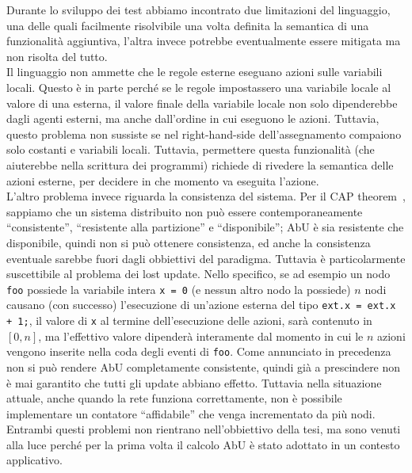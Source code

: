 \documentclass[target=bach]{thud}
\begin{document}
Durante lo sviluppo dei test abbiamo incontrato due limitazioni del linguaggio, una delle quali facilmente risolvibile una volta definita la semantica di una funzionalità aggiuntiva, l'altra invece potrebbe eventualmente essere mitigata ma non risolta del tutto.\\
Il linguaggio non ammette che le regole esterne eseguano azioni sulle variabili locali. Questo è in parte perché se le regole impostassero una variabile locale al valore di una esterna, il valore finale della variabile locale non solo dipenderebbe dagli agenti esterni, ma anche dall'ordine in cui eseguono le azioni. Tuttavia, questo problema non sussiste se nel right-hand-side dell'assegnamento compaiono solo costanti e variabili locali. Tuttavia, permettere questa funzionalità (che aiuterebbe nella scrittura dei programmi) richiede di rivedere la semantica delle azioni esterne, per decidere in che momento va eseguita l'azione.\\
L'altro problema invece riguarda la consistenza del sistema. Per il CAP theorem~\cite{brewer2000towards}, sappiamo che un sistema distribuito non può essere contemporaneamente ``consistente'', ``resistente alla partizione'' e ``disponibile''; AbU è sia resistente che disponibile, quindi non si può ottenere consistenza, ed anche la consistenza eventuale sarebbe fuori dagli obbiettivi del paradigma.
Tuttavia è particolarmente suscettibile al problema dei lost update. Nello specifico, se ad esempio un nodo \lstinline{foo} possiede la variabile intera \lstinline{x = 0} (e nessun altro nodo la possiede) $n$ nodi causano (con successo) l'esecuzione di un'azione esterna del tipo \lstinline{ext.x = ext.x + 1;}, il valore di \lstinline{x} al termine dell'esecuzione delle azioni, sarà contenuto in $[0,n]$, ma l'effettivo valore dipenderà interamente dal momento in cui le $n$ azioni vengono inserite nella coda degli eventi di \lstinline{foo}.
Come annunciato in precedenza non si può rendere AbU completamente consistente, quindi già a prescindere non è mai garantito che tutti gli update abbiano effetto. Tuttavia nella situazione attuale, anche quando la rete funziona correttamente, non è possibile implementare un contatore ``affidabile'' che venga incrementato da più nodi.\\
Entrambi questi problemi non rientrano nell'obbiettivo della tesi, ma sono venuti alla luce perché per la prima volta il calcolo AbU è stato adottato in un contesto applicativo.%
\end{document}
